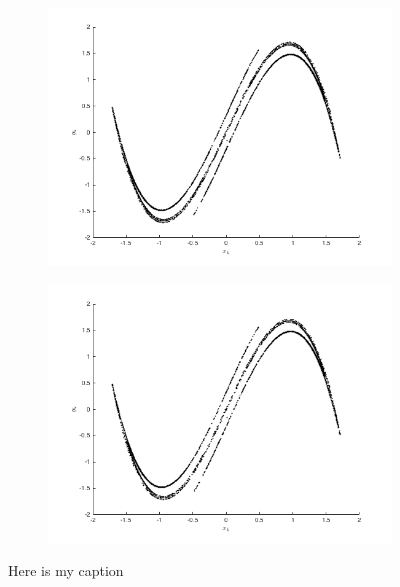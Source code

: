 \documentclass[%
 aip,12pt,
rsi,%
 amsmath,amssymb,
 reprint,%
]{revtex4-1}
\begin{document}
{\begin{figure}[t]
\centering
\begin{subfigure}{.5\textwidth}
  \includegraphics[width=.8\linewidth]{DD_A.png}
\end{subfigure}%
\begin{subfigure}{.5\textwidth}
  \includegraphics[width=.8\linewidth]{DD_S.png}
\end{subfigure}
\caption{Here is my caption\label{fig:DD}}
\end{figure}


}
\end{document}
